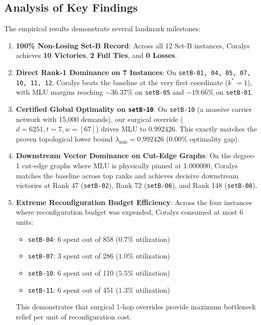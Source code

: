 \documentclass[10pt,journal,compsoc]{IEEEtran}
\begin{document}
\subsection{Analysis of Key Findings}
The empirical results demonstrate several landmark milestones:
\begin{enumerate}
    \item \textbf{100\% Non-Losing Set-B Record}: Across all 12 Set-B instances, Coralys achieves \textbf{10 Victories}, \textbf{2 Full Ties}, and \textbf{0 Losses}.
    \item \textbf{Direct Rank-1 Dominance on 7 Instances}: On \texttt{setB-01, 04, 05, 07, 10, 11, 12}, Coralys beats the baseline at the very first coordinate ($k^*=1$), with MLU margins reaching $-36.37\%$ on \texttt{setB-05} and $-19.66\%$ on \texttt{setB-01}.
    \item \textbf{Certified Global Optimality on \texttt{setB-10}}: On \texttt{setB-10} (a massive carrier network with 15,000 demands), our surgical override ($d=6251, t=7, w=[67]$) drives MLU to $0.992426$. This exactly matches the proven topological lower bound $\lambda_{\min} = 0.992426$ ($0.00\%$ optimality gap).
    \item \textbf{Downstream Vector Dominance on Cut-Edge Graphs}: On the degree-1 cut-edge graphs where MLU is physically pinned at 1.000000, Coralys matches the baseline across top ranks and achieves decisive downstream victories at Rank 47 (\texttt{setB-02}), Rank 72 (\texttt{setB-06}), and Rank 148 (\texttt{setB-08}).
    \item \textbf{Extreme Reconfiguration Budget Efficiency}: Across the four instances where reconfiguration budget was expended, Coralys consumed at most 6 units:
    \begin{itemize}
        \item \texttt{setB-04}: 6 spent out of 858 ($0.7\%$ utilization)
        \item \texttt{setB-07}: 3 spent out of 286 ($1.0\%$ utilization)
        \item \texttt{setB-10}: 6 spent out of 110 ($5.5\%$ utilization)
        \item \texttt{setB-11}: 6 spent out of 451 ($1.3\%$ utilization)
    \end{itemize}
    This demonstrates that surgical 1-hop overrides provide maximum bottleneck relief per unit of reconfiguration cost.
\end{enumerate}
\end{document}
